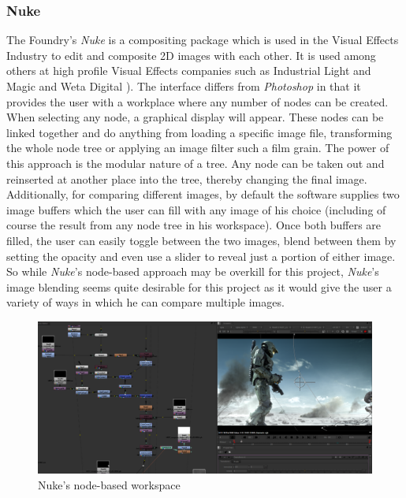 \documentclass[a4paper,11pt,twoside]{article}
\begin{document}
\subsubsection{Nuke}
The Foundry's \textit{Nuke} is a compositing package which is used in the Visual Effects Industry to edit and composite 2D images with each other. It is used among others at high profile Visual Effects companies such as Industrial Light and Magic and Weta Digital\cite{nuke1} \cite{nuke2}). The interface differs from \textit{Photoshop} in that it provides the user with a workplace where any number of nodes can be created. When selecting any node, a graphical display will appear. These nodes can be linked together and do anything from loading a specific image file, transforming the whole node tree or applying an image filter such a film grain. The power of this approach is the modular nature of a tree. Any node can be taken out and reinserted at another place into the tree, thereby changing the final image. Additionally, for comparing different images, by default the software supplies two image buffers which the user can fill with any image of his choice (including of course the result from any node tree in his workspace). Once both buffers are filled, the user can easily toggle between the two images, blend between them by setting the opacity and even use a slider to reveal just a portion of either image. So while \textit{Nuke}'s node-based approach may be overkill for this project, \textit{Nuke}'s image blending seems quite desirable for this project as it would give the user a variety of ways in which he can compare multiple images. 


\begin{figure}[ht!]
\centering
\includegraphics[width=170mm]{..//literatureSurvey/graphics/nuke_02.png}
\caption{Nuke's node-based workspace}
\label{fig:UIdesign1}
\end{figure}
\end{document}
